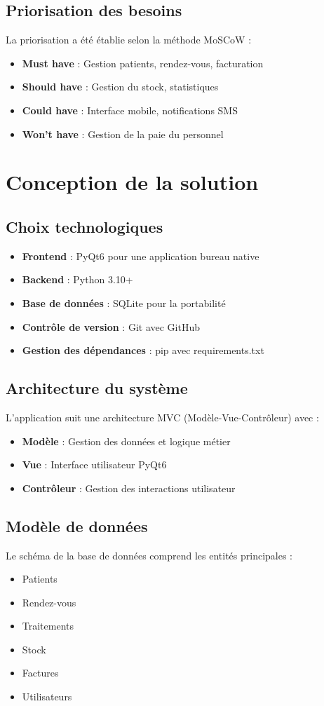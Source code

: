 \documentclass[12pt,a4paper]{report}
\begin{document}
\section{Priorisation des besoins}
La priorisation a été établie selon la méthode MoSCoW :
\begin{itemize}
    \item \textbf{Must have} : Gestion patients, rendez-vous, facturation
    \item \textbf{Should have} : Gestion du stock, statistiques
    \item \textbf{Could have} : Interface mobile, notifications SMS
    \item \textbf{Won't have} : Gestion de la paie du personnel
\end{itemize}

\chapter{Conception de la solution}
\section{Choix technologiques}
\begin{itemize}
    \item \textbf{Frontend} : PyQt6 pour une application bureau native
    \item \textbf{Backend} : Python 3.10+
    \item \textbf{Base de données} : SQLite pour la portabilité
    \item \textbf{Contrôle de version} : Git avec GitHub
    \item \textbf{Gestion des dépendances} : pip avec requirements.txt
\end{itemize}

\section{Architecture du système}
L'application suit une architecture MVC (Modèle-Vue-Contrôleur) avec :
\begin{itemize}
    \item \textbf{Modèle} : Gestion des données et logique métier
    \item \textbf{Vue} : Interface utilisateur PyQt6
    \item \textbf{Contrôleur} : Gestion des interactions utilisateur
\end{itemize}

\section{Modèle de données}
Le schéma de la base de données comprend les entités principales :
\begin{itemize}
    \item Patients
    \item Rendez-vous
    \item Traitements
    \item Stock
    \item Factures
    \item Utilisateurs
\end{itemize}
\end{document}
